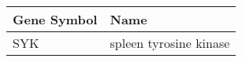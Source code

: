 \begin{tabular}{ll}
\toprule
Gene Symbol &                   Name \\
\midrule
        SYK & spleen tyrosine kinase \\
\bottomrule
\end{tabular}

